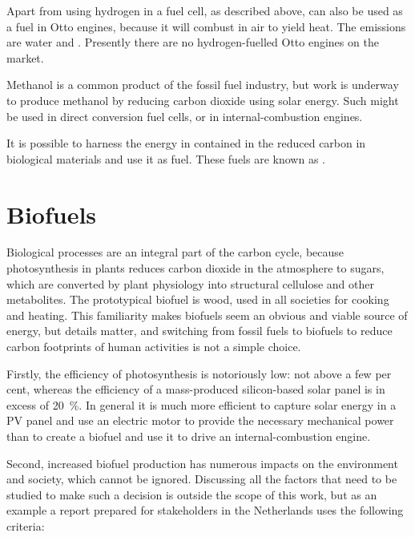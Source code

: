 Apart from using hydrogen in a fuel cell, as described above, 
can also be used as a fuel in Otto engines, because it will combust in air to
yield heat. The emissions are water and \nox. Presently there are no
hydrogen-fuelled Otto engines on the market.

Methanol is a common product of the fossil fuel industry, but work is underway
to produce methanol by reducing carbon dioxide using solar energy. Such
 might be used in direct conversion fuel cells, or in
internal\hyp{}combustion engines.

It is possible to harness the energy in contained in the reduced carbon in
biological materials and use it as fuel. These fuels are known as
.

\section{Biofuels}

Biological processes are an integral part of the carbon cycle, because
photosynthesis in plants reduces carbon dioxide in the atmosphere to sugars,
which are converted by plant physiology into structural cellulose and other
metabolites. The prototypical biofuel is wood, used in all societies for cooking
and heating. This familiarity makes biofuels seem an obvious and viable source
of energy, but details matter, and switching from fossil fuels to biofuels to
reduce carbon footprints of human activities is not a simple choice.

Firstly, the efficiency of photosynthesis is notoriously low: not above a few
per cent, whereas the efficiency of a mass-produced silicon-based solar panel is
in excess of \SI{20}{\percent}. In general it is much more efficient to capture
solar energy in a PV panel and use an electric motor to provide the necessary
mechanical power than to create a biofuel and use it to drive an
internal-combustion engine.
 
Second, increased biofuel production has numerous impacts on the environment and
society, which cannot be ignored. Discussing all the factors that need to be
studied to make such a decision is outside the scope of this work, but as an
example a report prepared for stakeholders in the Netherlands
\autocite{Smeets2006} uses the following criteria:

